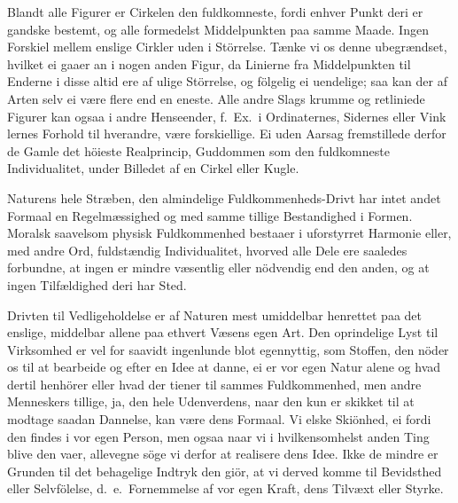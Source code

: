 \documentclass[12pt,a4paper]{article}
\newcommand{\opage}[1]{\marginnote{\footnotesize\textit{[#1]}}}
\begin{document}
Blandt alle Figurer er Cirkelen den fuldkomneste, fordi enhver Punkt deri
er gandske bestemt, og alle formedelst Middelpunkten paa samme Maade.
Ingen Forskiel mellem enslige Cirkler uden i Störrelse. Tænke vi os denne
ubegrændset, hvilket ei gaaer an i nogen anden Figur, da Linierne fra
Middelpunkten til Enderne i disse altid ere af ulige Störrelse, og fölgelig
ei uendelige; saa kan der af Arten selv ei være flere end en eneste. Alle
andre Slags krumme og retliniede Figurer kan ogsaa i andre Henseender,
f.~Ex.\ i Ordinaternes, Sidernes eller Vink%
\opage{234}lernes Forhold til hverandre, være forskiellige. Ei uden Aarsag
fremstillede derfor de Gamle det höieste Realprincip, Guddommen som den
fuldkomneste Individualitet, under Billedet af en Cirkel eller Kugle.

Naturens hele Stræben, den almindelige Fuldkommenheds-Drivt har intet
andet Formaal en Regelmæssighed og med samme tillige Bestandighed i
Formen. Moralsk saavelsom physisk Fuldkommenhed bestaaer i uforstyrret
Harmonie eller, med andre Ord, fuldstændig Individualitet, hvorved alle
Dele ere saaledes forbundne, at ingen er mindre væsentlig eller nödvendig
end den anden, og at ingen Tilfældighed deri har Sted.

Drivten til Vedligeholdelse er af Naturen mest umiddelbar henrettet paa
det enslige, middelbar allene paa ethvert Væsens egen Art. Den oprindelige
Lyst til Virksomhed er vel for saavidt ingenlunde blot egennyttig, som
Stoffen, den nöder os til at bearbeide og efter en Idee at danne, ei er
vor egen Natur alene og hvad dertil henhörer eller hvad der tiener til
sammes Fuldkommenhed, men andre Menneskers tillige, ja, den hele
Udenverdens, naar den kun er skikket til at modtage saadan Dannelse, kan
være dens Formaal. Vi elske Skiönhed, ei fordi den findes i vor egen
Person, men ogsaa naar vi i hvilkensomhelst anden Ting blive den vaer,
allevegne söge vi derfor at realisere dens Idee. Ikke de mindre er Grunden
til det behagelige Indtryk den giör, at vi derved komme til Bevidsthed
eller Selvfölelse, d.~e.\ Fornemmelse af vor egen Kraft, dens Tilvæxt eller
Styrke.
\end{document}
